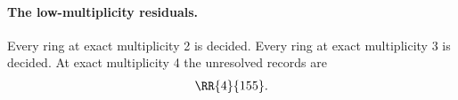 \paragraph{The low-multiplicity residuals.}
Every ring at exact multiplicity 2 is decided.
Every ring at exact multiplicity 3 is decided.
At exact multiplicity 4 the unresolved records are
\[\begin{gathered}
\RR{4}{155}.
\end{gathered}\]
